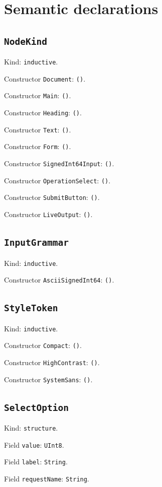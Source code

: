\documentclass[11pt]{article}
\begin{document}
\section*{Semantic declarations}
\subsection*{\texttt{NodeKind}}
\noindent Kind: \texttt{inductive}.\par
\noindent Constructor \texttt{Document}: \texttt{()}.\par
\noindent Constructor \texttt{Main}: \texttt{()}.\par
\noindent Constructor \texttt{Heading}: \texttt{()}.\par
\noindent Constructor \texttt{Text}: \texttt{()}.\par
\noindent Constructor \texttt{Form}: \texttt{()}.\par
\noindent Constructor \texttt{SignedInt64Input}: \texttt{()}.\par
\noindent Constructor \texttt{OperationSelect}: \texttt{()}.\par
\noindent Constructor \texttt{SubmitButton}: \texttt{()}.\par
\noindent Constructor \texttt{LiveOutput}: \texttt{()}.\par
\subsection*{\texttt{InputGrammar}}
\noindent Kind: \texttt{inductive}.\par
\noindent Constructor \texttt{AsciiSignedInt64}: \texttt{()}.\par
\subsection*{\texttt{StyleToken}}
\noindent Kind: \texttt{inductive}.\par
\noindent Constructor \texttt{Compact}: \texttt{()}.\par
\noindent Constructor \texttt{HighContrast}: \texttt{()}.\par
\noindent Constructor \texttt{SystemSans}: \texttt{()}.\par
\subsection*{\texttt{SelectOption}}
\noindent Kind: \texttt{structure}.\par
\noindent Field \texttt{value}: \texttt{UInt8}.\par
\noindent Field \texttt{label}: \texttt{String}.\par
\noindent Field \texttt{requestName}: \texttt{String}.\par
\end{document}
